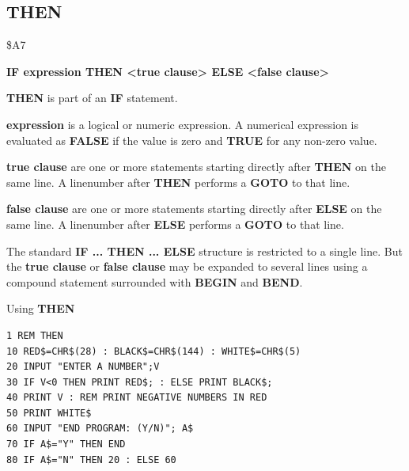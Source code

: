\subsection{THEN}
\begin{description}[leftmargin=2cm,style=nextline]
\item [Token:] \$A7
\item [Format:] {\bf IF expression THEN <true clause> ELSE <false clause>}
\item [Usage:] {\bf THEN} is part of an {\bf IF} statement.

               {\bf expression} is a logical or numeric expression.
               A numerical expression is evaluated as {\bf FALSE}
               if the value is zero and {\bf TRUE} for any non-zero
               value.

               {\bf true clause} are one or more statements starting
               directly after {\bf THEN} on the same line.
               A linenumber after {\bf THEN} performs a
               {\bf GOTO} to that line.

               {\bf false clause} are one or more statements starting
               directly after {\bf ELSE} on the same line.
               A linenumber after {\bf ELSE} performs a
               {\bf GOTO} to that line.

\item [Remarks:]
               The standard {\bf IF ... THEN ... ELSE} structure
               is restricted to a single line. But the {\bf true clause}
               or {\bf false clause} may be expanded to several lines
               using a compound statement surrounded with
               {\bf BEGIN} and {\bf BEND}.
\item [Example:]
                Using {\bf THEN}
\begin{tcolorbox}[colback=black,coltext=white]
\verbatimfont{\codefont}
\begin{verbatim}
1 REM THEN
10 RED$=CHR$(28) : BLACK$=CHR$(144) : WHITE$=CHR$(5)
20 INPUT "ENTER A NUMBER";V
30 IF V<0 THEN PRINT RED$; : ELSE PRINT BLACK$;
40 PRINT V : REM PRINT NEGATIVE NUMBERS IN RED
50 PRINT WHITE$
60 INPUT "END PROGRAM: (Y/N)"; A$
70 IF A$="Y" THEN END
80 IF A$="N" THEN 20 : ELSE 60
\end{verbatim}
\end{tcolorbox}
\end{description}


